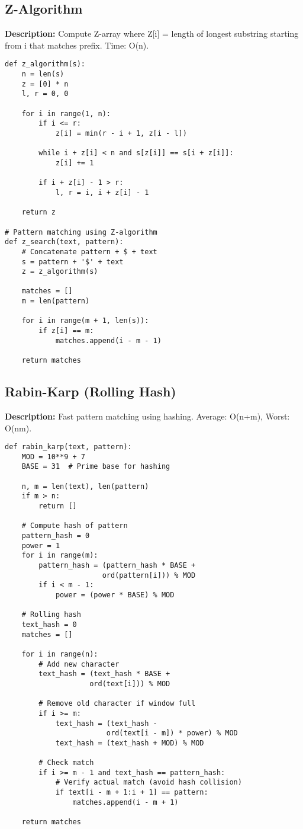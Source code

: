 \subsection{Z-Algorithm}
\textbf{Description:} Compute Z-array where Z[i] = length of longest substring starting from i that matches prefix. Time: O(n).

\begin{lstlisting}
def z_algorithm(s):
    n = len(s)
    z = [0] * n
    l, r = 0, 0
    
    for i in range(1, n):
        if i <= r:
            z[i] = min(r - i + 1, z[i - l])
        
        while i + z[i] < n and s[z[i]] == s[i + z[i]]:
            z[i] += 1
        
        if i + z[i] - 1 > r:
            l, r = i, i + z[i] - 1
    
    return z

# Pattern matching using Z-algorithm
def z_search(text, pattern):
    # Concatenate pattern + $ + text
    s = pattern + '$' + text
    z = z_algorithm(s)
    
    matches = []
    m = len(pattern)
    
    for i in range(m + 1, len(s)):
        if z[i] == m:
            matches.append(i - m - 1)
    
    return matches
\end{lstlisting}

\subsection{Rabin-Karp (Rolling Hash)}
\textbf{Description:} Fast pattern matching using hashing. Average: O(n+m), Worst: O(nm).

\begin{lstlisting}
def rabin_karp(text, pattern):
    MOD = 10**9 + 7
    BASE = 31  # Prime base for hashing
    
    n, m = len(text), len(pattern)
    if m > n:
        return []
    
    # Compute hash of pattern
    pattern_hash = 0
    power = 1
    for i in range(m):
        pattern_hash = (pattern_hash * BASE + 
                       ord(pattern[i])) % MOD
        if i < m - 1:
            power = (power * BASE) % MOD
    
    # Rolling hash
    text_hash = 0
    matches = []
    
    for i in range(n):
        # Add new character
        text_hash = (text_hash * BASE + 
                    ord(text[i])) % MOD
        
        # Remove old character if window full
        if i >= m:
            text_hash = (text_hash - 
                        ord(text[i - m]) * power) % MOD
            text_hash = (text_hash + MOD) % MOD
        
        # Check match
        if i >= m - 1 and text_hash == pattern_hash:
            # Verify actual match (avoid hash collision)
            if text[i - m + 1:i + 1] == pattern:
                matches.append(i - m + 1)
    
    return matches
\end{lstlisting}
